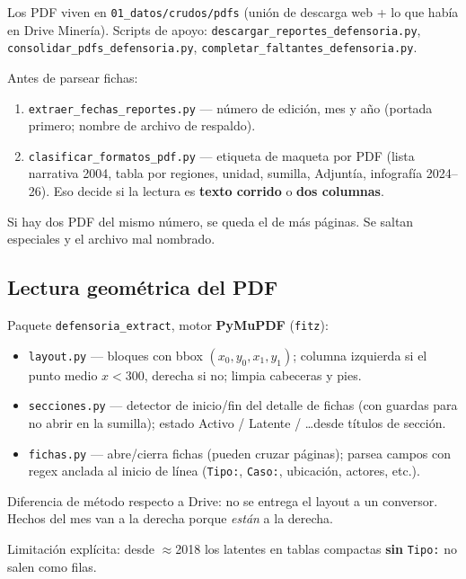 \documentclass[11pt,a4paper]{article}
\begin{document}
Los PDF viven en \texttt{01\_datos/crudos/pdfs} (unión de descarga web + lo que había en Drive Minería). Scripts de apoyo: \texttt{descargar\_reportes\_defensoria.py}, \texttt{consolidar\_pdfs\_defensoria.py}, \texttt{completar\_faltantes\_defensoria.py}.

Antes de parsear fichas:

\begin{enumerate}
  \item \texttt{extraer\_fechas\_reportes.py} --- número de edición, mes y año (portada primero; nombre de archivo de respaldo).
  \item \texttt{clasificar\_formatos\_pdf.py} --- etiqueta de maqueta por PDF (lista narrativa 2004, tabla por regiones, unidad, sumilla, Adjuntía, infografía 2024--26). Eso decide si la lectura es \textbf{texto corrido} o \textbf{dos columnas}.
\end{enumerate}

Si hay dos PDF del mismo número, se queda el de más páginas. Se saltan especiales y el archivo mal nombrado.

\subsection{Lectura geométrica del PDF}

Paquete \texttt{defensoria\_extract}, motor \textbf{PyMuPDF} (\texttt{fitz}):

\begin{itemize}
  \item \texttt{layout.py} --- bloques con bbox $(x_0,y_0,x_1,y_1)$; columna izquierda si el punto medio $x<300$, derecha si no; limpia cabeceras y pies.
  \item \texttt{secciones.py} --- detector de inicio/fin del detalle de fichas (con guardas para no abrir en la sumilla); estado Activo / Latente / \ldots desde títulos de sección.
  \item \texttt{fichas.py} --- abre/cierra fichas (pueden cruzar páginas); parsea campos con regex anclada al inicio de línea (\texttt{Tipo:}, \texttt{Caso:}, ubicación, actores, etc.).
\end{itemize}

Diferencia de método respecto a Drive: no se entrega el layout a un conversor. Hechos del mes van a la derecha porque \emph{están} a la derecha.

Limitación explícita: desde $\approx$2018 los latentes en tablas compactas \textbf{sin} \texttt{Tipo:} no salen como filas.
\end{document}
